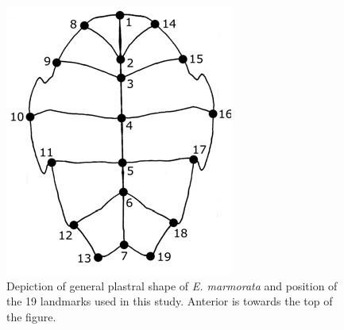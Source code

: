 \documentclass[11pt]{article}
\begin{document}
\begin{figure}[h!]
  \centering
  \includegraphics[height = 0.6\textheight, width = \textwidth, keepaspectratio = true]{figure/plastra}
  \caption{Depiction of general plastral shape of \textit{E. marmorata} and position of the 19 landmarks used in this study. Anterior is towards the top of the figure.}
  \label{fig:plastra}
\end{figure}
\end{document}
